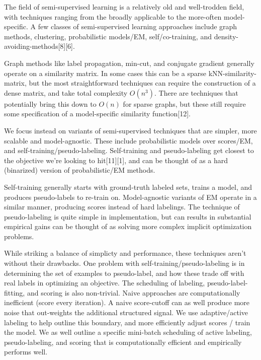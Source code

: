 \documentclass{article}
\begin{document}
The field of semi-supervised learning is a relatively old and well-trodden field, with techniques ranging from the broadly applicable to the more-often model-specific.  A few classes of semi-supervised learning approaches include graph methods, clustering, probabilistic models/EM, self/co-training, and density-avoiding-methods[8][6].  

Graph methods like label propagation, min-cut, and conjugate gradient generally operate on a similarity matrix.  In some cases this can be a sparse kNN-similarity-matrix, but the most straightforward techniques can require the construction of a dense matrix, and take total complexity $O(n^3)$.  There are techniques that potentially bring this down to $O(n)$ for sparse graphs, but these still require some specification of a model-specific similarity function[12].  

We focus instead on variants of semi-supervised techniques that are simpler, more scalable and model-agnostic.  These include probabilistic models over scores/EM, and self-training/pseudo-labeling.  Self-training and pseudo-labeling get closest to the objective we're looking to hit[11][1], and can be thought of as a hard (binarized) version of probabilistic/EM methods.  

Self-training generally starts with ground-truth labeled sets, trains a model, and produces pseudo-labels to re-train on.  Model-agnostic variants of EM operate in a similar manner, producing scores instead of hard labelings.  The technique of pseudo-labeling is quite simple in implementation, but can results in substantial empirical gains can be thought of as solving more complex implicit optimization problems.

While striking a balance of simplicty and performance, these techniques aren't without their drawbacks.  One problem with self-training/pseudo-labeling is in determining the set of examples to pseudo-label, and how these trade off with real labels in optimizing an objective.  The scheduling of labeling, pseudo-label-fitting, and scoring is also non-trivial.  Naive approaches are computationally inefficient (score every iteration).  A naive score-cutoff can as well produce more noise that out-weights the additional structured signal.  We use adaptive/active labeling to help outline this boundary, and more efficiently adjust scores / train the model.  We as well outline a specific mini-batch scheduling of active labeling, pseudo-labeling, and scoring that is computationally efficient and empirically performs well.   
\end{document}

